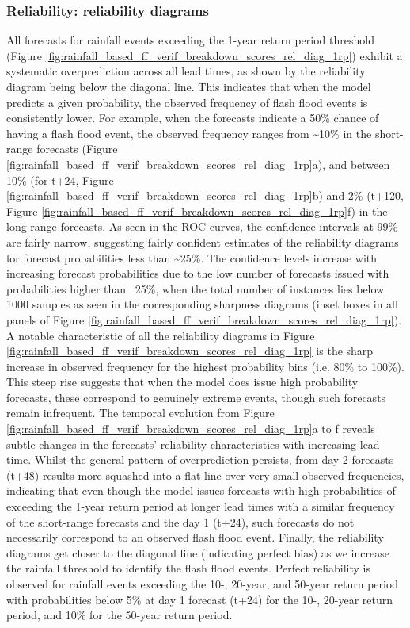 \subsubsection{Reliability: reliability diagrams}

All  forecasts for rainfall events exceeding the 1-year return period threshold (Figure \ref{fig:rainfall_based_ff_verif_breakdown_scores_rel_diag_1rp}) exhibit a systematic overprediction across all lead times, as shown by the reliability diagram being below the diagonal line. This indicates that when the model predicts a given probability, the observed frequency of flash flood events is consistently lower. For example, when the forecasts indicate a 50\% chance of having a flash flood event, the observed frequency ranges from \sim10\% in the short-range forecasts (Figure \ref{fig:rainfall_based_ff_verif_breakdown_scores_rel_diag_1rp}a), and between 10\% (for t+24, Figure \ref{fig:rainfall_based_ff_verif_breakdown_scores_rel_diag_1rp}b) and 2\% (t+120, Figure \ref{fig:rainfall_based_ff_verif_breakdown_scores_rel_diag_1rp}f) in the long-range forecasts. As seen in the ROC curves, the confidence intervals at 99\% are fairly narrow, suggesting fairly confident estimates of the reliability diagrams for forecast probabilities less than \sim25\%. The confidence levels increase with increasing forecast probabilities due to the low number of forecasts issued with probabilities higher than ~25\%, when the total number of instances lies below 1000 samples as seen in the corresponding sharpness diagrams (inset boxes in all panels of Figure \ref{fig:rainfall_based_ff_verif_breakdown_scores_rel_diag_1rp}). A notable characteristic of all the reliability diagrams in Figure \ref{fig:rainfall_based_ff_verif_breakdown_scores_rel_diag_1rp} is the sharp increase in observed frequency for the highest probability bins (i.e. 80\% to 100\%). This steep rise suggests that when the model does issue high probability forecasts, these correspond to genuinely extreme events, though such forecasts remain infrequent. The temporal evolution from Figure \ref{fig:rainfall_based_ff_verif_breakdown_scores_rel_diag_1rp}a to f reveals subtle changes in the forecasts' reliability characteristics with increasing lead time. Whilst the general pattern of overprediction persists, from day 2 forecasts (t+48) results more squashed into a flat line over very small observed frequencies, indicating that even though the model issues forecasts with high probabilities of exceeding the 1-year return period at longer lead times with a similar frequency of the short-range forecasts and the day 1 (t+24), such forecasts do not necessarily correspond to an observed flash flood event. Finally, the reliability diagrams get closer to the diagonal line (indicating perfect bias) as we increase the rainfall threshold to identify the flash flood events. Perfect reliability is observed for rainfall events exceeding the 10-, 20-year, and 50-year return period with probabilities below 5\% at day 1 forecast (t+24) for the 10-, 20-year return period, and 10\% for the 50-year return period.

